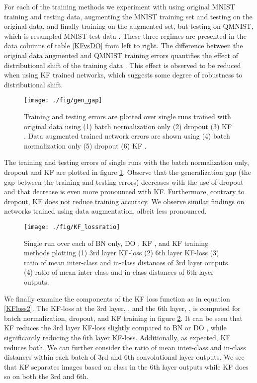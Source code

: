 \documentclass[11pt]{article}
\begin{document}
For each of the training methods we experiment with using original MNIST training and testing data, augmenting the MNIST training set and testing on the original data, and finally training on the augmented set, but testing on QMNIST, which is resampled MNIST test data \cite{qmnist}.  These three regimes are presented in the data columns of table \ref{KFvsDO} from left to right.  The difference between the original data augmented and QMNIST training errors quantifies the effect of distributional shift of the training data \cite{indistshift}.  This effect is observed to be reduced when using KF trained networks, which suggests some degree of robustness to distributional shift.
\begin{figure}[h!]
	\begin{center}
			\texttt{[image: ./fig/gen\_gap]}
		\caption{Training and testing errors are plotted over single runs trained with original data using (1) batch normalization only (2) dropout  (3) KF .  Data augmented trained network errors are shown using (4) batch normalization only (5) dropout  (6) KF .}\label{gengap}
	\end{center}
\end{figure}
The training and testing errors of single runs with the batch normalization only, dropout  and KF  are plotted in figure \ref{gengap}.  Observe that the generalization gap (the gap between the training and testing errors) decreases with the use of dropout and that decrease is even more pronounced with KF.  Furthermore, contrary to dropout,  KF does not reduce training accuracy.  We observe similar findings on networks trained using data augmentation, albeit less pronounced.
\begin{figure}[h!]
	\begin{center}
			\texttt{[image: ./fig/KF\_lossratio]}
		\caption{Single run over each of BN only, DO , KF , and KF training methods plotting (1) 3rd layer KF-loss (2) 6th layer KF-loss (3) ratio of mean inter-class and in-class distances of 3rd layer outputs (4) ratio of mean inter-class and in-class distances of 6th layer outputs.}\label{KF_lossratio}
	\end{center}
\end{figure}
We finally examine the components of the KF  loss function as in equation \eqref{KFloss2}.  The KF-loss at the 3rd layer, , and the 6th layer, , is computed for batch normalization, dropout, and KF training in figure \ref{KF_lossratio}.  It can be seen that KF  reduces the 3rd layer KF-loss slightly compared to BN or DO , while significantly reducing the 6th layer KF-loss.  Additionally, as expected, KF  reduces both.  We can further consider the ratio of mean inter-class and in-class distances within each batch of 3rd and 6th convolutional layer outputs.  We see that KF  separates images based on class in the 6th layer outputs while KF  does so on both the 3rd and 6th.
\end{document}
